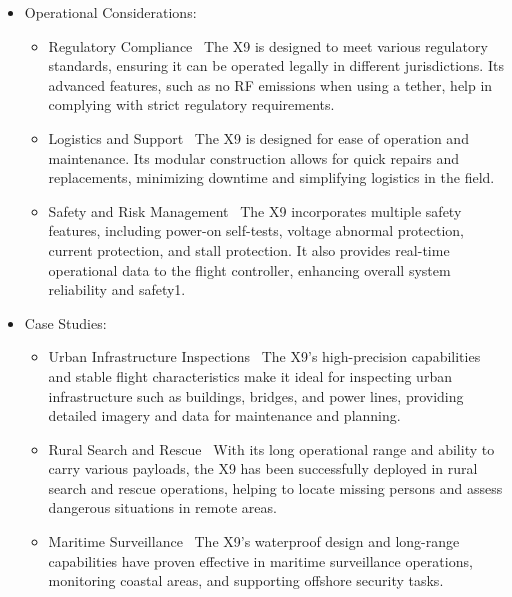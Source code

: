 \begin{itemize}
\begin{itemize}
\begin{itemize}
    \end{itemize}
    \end{itemize}
    \item Operational Considerations:
    \begin{itemize}
    \item Regulatory Compliance \
    The X9 is designed to meet various regulatory standards, ensuring it can be operated legally in different jurisdictions. Its advanced features, such as no RF emissions when using a tether, help in complying with strict regulatory requirements.
    \item Logistics and Support \
    The X9 is designed for ease of operation and maintenance. Its modular construction allows for quick repairs and replacements, minimizing downtime and simplifying logistics in the field.
    \item Safety and Risk Management \
    The X9 incorporates multiple safety features, including power-on self-tests, voltage abnormal protection, current protection, and stall protection. It also provides real-time operational data to the flight controller, enhancing overall system reliability and safety1.
    \end{itemize}
    \item Case Studies:
    \begin{itemize}
    \item Urban Infrastructure Inspections \
    The X9's high-precision capabilities and stable flight characteristics make it ideal for inspecting urban infrastructure such as buildings, bridges, and power lines, providing detailed imagery and data for maintenance and planning.
    \item Rural Search and Rescue \
    With its long operational range and ability to carry various payloads, the X9 has been successfully deployed in rural search and rescue operations, helping to locate missing persons and assess dangerous situations in remote areas.
    \item Maritime Surveillance \
    The X9's waterproof design and long-range capabilities have proven effective in maritime surveillance operations, monitoring coastal areas, and supporting offshore security tasks.
    \end{itemize}
    \end{itemize}